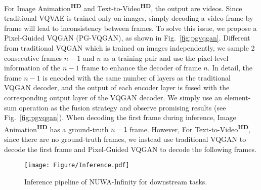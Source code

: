 \documentclass{article}
\begin{document}
For Image Animation\textsuperscript{\textbf{HD}} and Text-to-Video\textsuperscript{\textbf{HD}}, the output are videos. Since traditional VQVAE is trained only on images, simply decoding a video frame-by-frame will lead to inconsistency between frames. To solve this issue, we propose a Pixel-Guided VQGAN (PG-VQGAN), as shown in Fig.~\ref{fig:pgvqgan}. Different from traditional VQGAN which is trained on images independently, we sample 2 consecutive frames $n-1$ and $n$ as a training pair and use the pixel-level information of the $n-1$ frame to enhance the decoder of frame $n$. In detail, the frame $n-1$ is encoded with the same number of layers as the traditional VQGAN decoder, and the output of each encoder layer is fused with the corresponding output layer of the VQGAN decoder. We simply use an element-sum operation as the fusion strategy and observe promising results (see Fig.~\ref{fig:pgvqgan}). 
When decoding the first frame during inference, Image Animation\textsuperscript{\textbf{HD}} has a ground-truth $n-1$ frame. However, 
For Text-to-Video\textsuperscript{\textbf{HD}}, since there are no ground-truth frames, we instead use traditional VQGAN to decode the first frame and Pixel-Guided VQGAN to decode the following frames.













 \begin{figure}[tbp]
    \centering
    \texttt{[image: Figure/Inference.pdf]}
    \caption{Inference pipeline of NUWA-Infinity for downstream tasks.}
    \label{fig:inference}
    \vspace{-4mm}
\end{figure}
\end{document}
